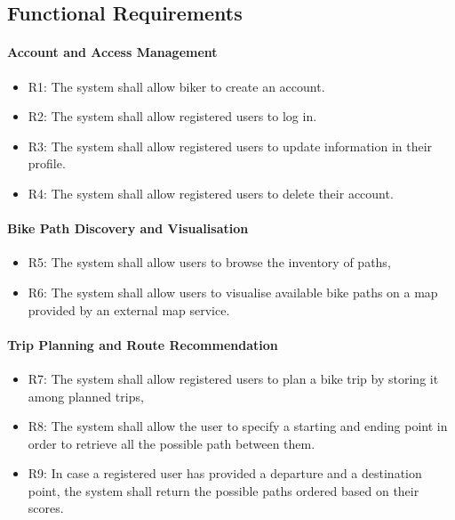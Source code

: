 \subsection{Functional Requirements}

\paragraph{Account and Access Management}
\begin{itemize}
    \item R1: The system shall allow biker to create an account.
    \item R2: The system shall allow registered users to log in.
    \item R3: The system shall allow registered users to update information in their profile.
    \item R4: The system shall allow registered users to delete their account.
\end{itemize}

\paragraph{Bike Path Discovery and Visualisation}
\begin{itemize}
    \item R5: The system shall allow users to browse the inventory of paths,
    \item R6: The system shall allow users to visualise available bike paths on a map provided by an external map service.
\end{itemize}

\paragraph{Trip Planning and Route Recommendation}
\begin{itemize}
    \item R7: The system shall allow registered users to plan a bike trip by storing it among planned trips,
    \item R8: The system shall allow the user to specify a starting and ending point in order to retrieve all the possible path between them.
    \item R9: In case a registered user has provided a departure and a destination point, the system shall return the possible paths ordered based on their scores.
\end{itemize}

